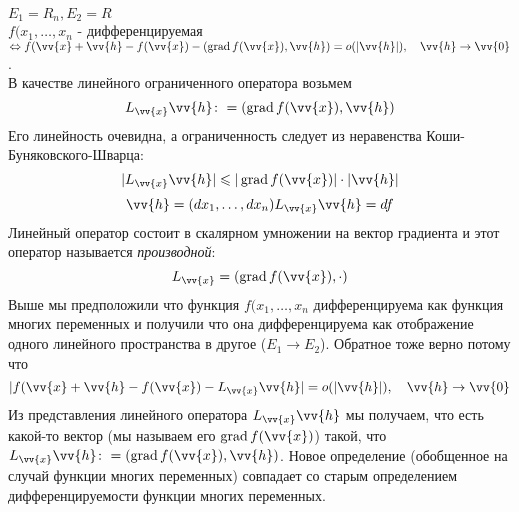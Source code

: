 \begin{example}
    $E_1 = R_n, E_2=R$\\
    $f(x_1, \dots, x_n$ - дифференцируемая $\Lra f(\vv{x} + \vv{h} - f(\vv{x}) - (\grad f(\vv{x}), \vv{h}) = o(|\vv{h}|), \quad \vv{h} \to \vv{0}$.\\
    В качестве линейного ограниченного оператора возьмем
    \[
        L_{\vv{x}} \vv{h} \colon = (\grad f(\vv{x}), \vv{h})
    \]
    Его линейность очевидна, а ограниченность следует из неравенства Коши-Буняковского-Шварца$\colon$
    \[
        |L_{\vv{x}} \vv{h}| \leq |\grad f(\vv{x})| \cdot |\vv{h}|
    \]
    \[
        \vv{h} =  (d x_1, \dots, d x_n)\\
        L_{\vv{x}} \vv{h} = d f
    \]
    Линейный оператор состоит в скалярном умножении на вектор градиента и этот оператор называется \textit{производной}$\colon$
    \[
         L_{\vv{x}} = (\grad f(\vv{x}), \cdot)
    \]
    Выше мы предположили что функция $f(x_1, \dots, x_n$ дифференцируема как функция многих переменных и получили что она дифференцируема как отображение одного линейного пространства в другое ($E_1 \to E_2$). Обратное тоже верно потому что 
    \[
        |f(\vv{x} + \vv{h} - f(\vv{x}) - L_{\vv{x}} \vv{h}|  = o(|\vv{h}|), \quad \vv{h} \to \vv{0}
    \]
     Из представления линейного оператора $L_{\vv{x}} \vv{h}$ мы получаем, что есть какой-то вектор (мы называем его $\grad f(\vv{x})$) такой, что $L_{\vv{x}} \vv{h} \colon = (\grad f(\vv{x}), \vv{h})$.
     Новое определение (обобщенное на случай функции многих переменных) совпадает со старым определением дифференцируемости функции многих переменных.
\end{example}

